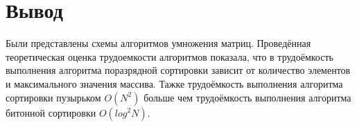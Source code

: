 \section{Вывод}
Были представлены схемы алгоритмов умножения матриц.
Проведённая теоретическая оценка трудоемкости алгоритмов показала, что в трудоёмкость выполнения алгоритма поразрядной сортировки зависит от количество элементов и максимального значения массива.
Тажке трудоёмкость выполнения алгоритма сортировки пузырьком $O(N ^ 2)$ больше чем трудоёмкость выполнения алгоритма битонной сортировки $O(log^2 N)$.